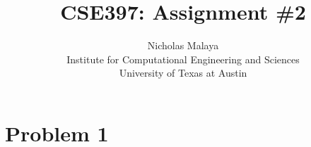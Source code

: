 \documentclass{article}
\title{\bf{CSE397: Assignment \#2}}
\author{Nicholas Malaya \\ Institute for Computational Engineering and Sciences \\ University of Texas at Austin} \date{}
\begin{document}
\maketitle

\newpage
\section{Problem 1}






\end{document}
